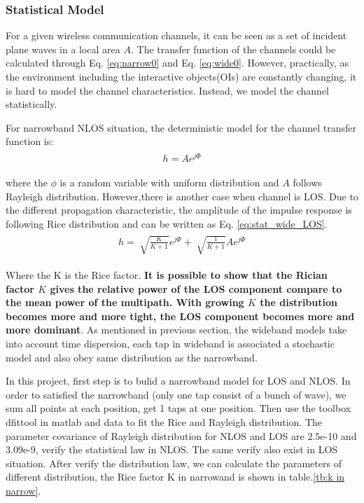 \documentclass[a4paper]{article}
\begin{document}
	\subsubsection{Statistical Model}
	
	For a given wireless communication channels, it can be seen as a set of incident plane waves in a local area $A$. The transfer function of the channels could be calculated through Eq. \ref{eq:narrow0} and Eq. \ref{eq:wide0}. However, practically, as the environment including the interactive objects(OIs) are constantly changing, it is hard to model the channel characteristics. Instead, we model the channel statistically. 
	
	For narrowband NLOS situation, the deterministic model for the channel transfer function is:
	\begin{align} 
		\begin{split}
			h = A e^{j\Phi}
		\end{split}
		\label{eq:stat_narrow_NLOS}
	\end{align}
    
    where the $\phi$ is a random variable with uniform distribution and $A$ follows Rayleigh distribution. However,there is another case when channel is LOS. Due to the different propagation characteristic, the amplitude of the impulse response is following Rice distribution and can be written as Eq. \ref{eq:stat_wide_LOS}.
	\begin{align} 
		\begin{split}
			h = \sqrt[]{\frac{K}{K+1}}e^{j\Phi}+\sqrt[]{\frac{1}{K+1}}A e^{j\Phi}
		\end{split}
		\label{eq:stat_wide_LOS}
	\end{align}
    
   Where the K is the Rice factor. \textbf{It is possible to show that the Rician factor $K$ gives the relative power of the LOS component compare to the mean power of the multipath. With growing $K$ the distribution becomes more and more tight, the LOS component becomes more and more dominant}. As mentioned in previous section, the wideband models take into account time dispersion,  each tap in wideband is associated a stochastic model and also obey same distribution as the narrowband.
   
   In this project, first step is to bulid a narrowband model for LOS and NLOS. In order to satisfied the narrowband (only one tap consist of a bunch  of wave), we sum all points at each  position, get 1 taps at one position. Then use the toolbox dfittool in matlab and data to fit the Rice and Rayleigh distribution. The parameter covariance of  Rayleigh distribution for NLOS and LOS are 
2.5e-10 and 3.09e-9, verify the statistical law in NLOS. The same verify also exist in  LOS situation.
   After verify the distribution law, we can calculate the parameters of different distribution, the Rice factor K in narrowand is shown in table.\ref{tb:k in narrow}.
   
\end{document}
